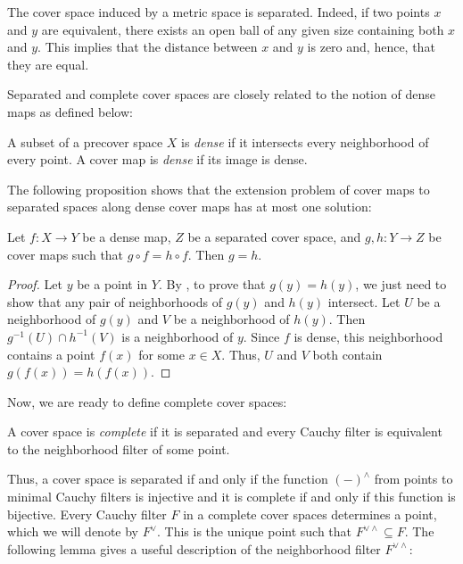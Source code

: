 \documentclass[reqno]{amsart}
\theoremstyle{definition}
\theoremstyle{remark}
\numberwithin{figure}{section}
\begin{document}
\begin{example}
The cover space induced by a metric space is separated.
Indeed, if two points $x$ and $y$ are equivalent, there exists an open ball of any given size containing both $x$ and $y$.
This implies that the distance between $x$ and $y$ is zero and, hence, that they are equal.
\end{example}

Separated and complete cover spaces are closely related to the notion of dense maps as defined below:

\begin{defn}
A subset of a precover space $X$ is \emph{dense} if it intersects every neighborhood of every point.
A cover map is \emph{dense} if its image is dense.
\end{defn}

The following proposition shows that the extension problem of cover maps to separated spaces along dense cover maps has at most one solution:

\begin{prop}
Let $f : X \to Y$ be a dense map, $Z$ be a separated cover space, and $g,h : Y \to Z$ be cover maps such that $g \circ f = h \circ f$.
Then $g = h$.
\end{prop}
\begin{proof}
Let $y$ be a point in $Y$.
By , to prove that $g(y) = h(y)$, we just need to show that any pair of neighborhoods of $g(y)$ and $h(y)$ intersect.
Let $U$ be a neighborhood of $g(y)$ and $V$ be a neighborhood of $h(y)$.
Then $g^{-1}(U) \cap h^{-1}(V)$ is a neighborhood of $y$.
Since $f$ is dense, this neighborhood contains a point $f(x)$ for some $x \in X$.
Thus, $U$ and $V$ both contain $g(f(x)) = h(f(x))$.
\end{proof}

Now, we are ready to define complete cover spaces:

\begin{defn}
A cover space is \emph{complete} if it is separated and every Cauchy filter is equivalent to the neighborhood filter of some point.
\end{defn}

Thus, a cover space is separated if and only if the function $(-)^\wedge$ from points to minimal Cauchy filters is injective and it is complete if and only if this function is bijective.
Every Cauchy filter $F$ in a complete cover spaces determines a point, which we will denote by $F^\vee$.
This is the unique point such that $F^{\vee \wedge} \subseteq F$.
The following lemma gives a useful description of the neighborhood filter $F^{\vee \wedge}$:
\end{document}
